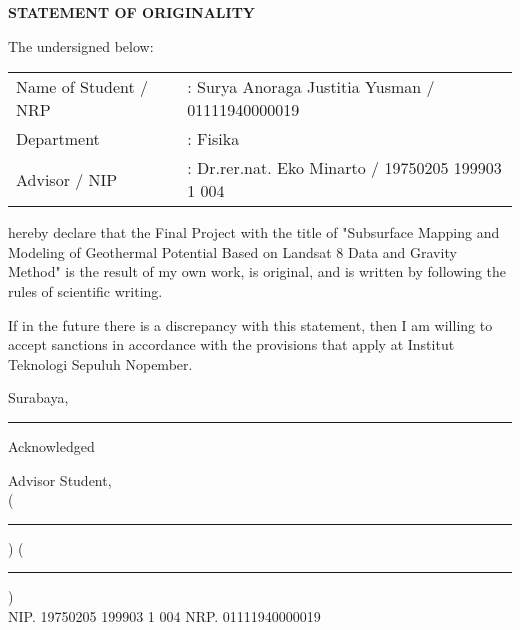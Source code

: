 \newpage
\thispagestyle{empty}
\begin{center}
    \textbf{STATEMENT OF ORIGINALITY}
\end{center}

\vskip20pt
The undersigned below:
\vskip15pt

\begin{tabular}[h]{ll}
    Name of Student / NRP &: Surya Anoraga Justitia Yusman / 01111940000019\\
    Department &: Fisika\\
    Advisor / NIP &: Dr.rer.nat. Eko Minarto / 19750205 199903 1 004\\
\end{tabular}

\vskip20pt

hereby declare that the Final Project with the title of "Subsurface Mapping and Modeling of Geothermal Potential Based on Landsat 8 Data and Gravity Method" is the result of my own work, is original, and is written by following the rules of scientific writing.

If in the future there is a discrepancy with this statement, then I am willing to accept sanctions 
in accordance with the provisions that apply at Institut Teknologi Sepuluh Nopember.

\hfill Surabaya,\rule{3cm}{0.2pt}

Acknowledged
\vskip 3pt

Advisor \hspace{7.1cm} Student,\\
\vskip2cm
(\rule{5cm}{0.2pt}) \hspace{3.2cm} (\rule{5cm}{0.2pt}) \\
NIP. 19750205 199903 1 004 \hspace{3.5cm} NRP. 01111940000019\\
